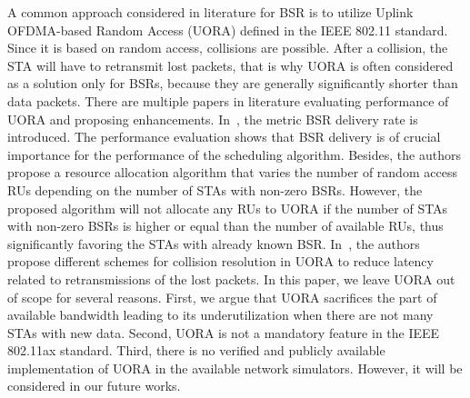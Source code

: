 A common approach considered in literature for BSR is to utilize Uplink
OFDMA-based Random Access (UORA) defined in the IEEE 802.11 standard.
Since it is based on random access, collisions are possible. After a collision,
the STA will have to retransmit lost packets, that is why UORA is often
considered as a solution only for BSRs, because they are generally significantly
shorter than data packets. There are multiple papers in literature evaluating
performance of UORA and proposing enhancements. In~\cite{1_Naik,
1_Bhattarai}, the metric BSR delivery rate is introduced.
The performance evaluation shows that BSR delivery is of crucial importance for
the performance of the scheduling algorithm. Besides, the authors propose a resource
allocation algorithm that varies the number of random access RUs depending on
the number of STAs with non-zero BSRs. However, the proposed algorithm will not
allocate any RUs to UORA if the number of STAs with non-zero BSRs is higher or
equal than the number of available RUs, thus significantly favoring the STAs
with already known BSR. In~\cite{1_Avdotin, 2_Avdotin, 3_Avdotin}, the authors
propose different schemes for collision resolution in UORA to reduce latency
related to retransmissions of the lost packets. In this paper, we leave UORA out
of scope for several reasons. First, we argue that UORA sacrifices the part of
available bandwidth leading to its underutilization when there are not many
STAs with new data. Second, UORA is not a mandatory feature in the IEEE 802.11ax
standard. Third, there is no verified and publicly available implementation of
UORA in the available network simulators. However, it will be considered in our
future works.

